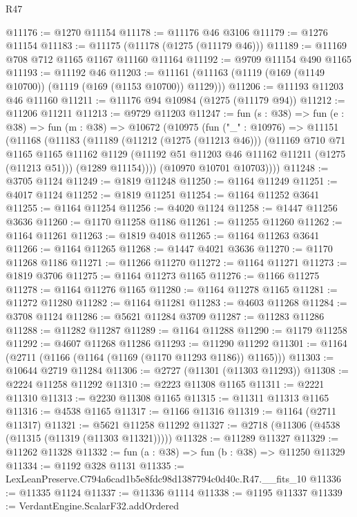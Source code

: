 \begin{lexlean}{R47}
\begin{coremodule}
@11176 := @1270 @11154
@11178 := @11176 @46 @3106
@11179 := @1276 @11154
@11183 := @11175 (@11178 (@1275 (@11179 @46)))
@11189 := @11169 @708 @712 @1165 @1167 @11160 @11164
@11192 := @9709 @11154 @490 @1165
@11193 := @11192 @46
@11203 := @11161 (@11163 (@1119 (@169 (@1149 @10700)) (@1119 (@169 (@1153 @10700)) @1129)))
@11206 := @11193 @11203 @46 @11160
@11211 := @11176 @94 @10984 (@1275 (@11179 @94))
@11212 := @11206 @11211
@11213 := @9729 @11203
@11247 := fun (s : @38) =>
  fun (e : @38) =>
  fun (m : @38) =>
  @10672
    (@10975
      (fun ("_" : @10976) =>
      @11151
        (@11168
          (@11183
            (@11189
              (@11212 (@1275 (@11213 @46)))
              (@11169
                @710
                @71
                @1165
                @1165
                @11162
                @1129
                (@11192 @51 @11203 @46 @11162 @11211 (@1275 (@11213 @51)))
                (@1289 @11154))))
          (@10970 @10701 @10703))))
@11248 := @3705 @1124
@11249 := @1819 @11248
@11250 := @1164 @11249
@11251 := @4017 @1124
@11252 := @1819 @11251
@11254 := @1164 @11252 @3641
@11255 := @1164 @11254
@11256 := @4020 @1124
@11258 := @1447 @11256 @3636
@11260 := @1170 @11258 @1186
@11261 := @11255 @11260
@11262 := @1164 @11261
@11263 := @1819 @4018
@11265 := @1164 @11263 @3641
@11266 := @1164 @11265
@11268 := @1447 @4021 @3636
@11270 := @1170 @11268 @1186
@11271 := @11266 @11270
@11272 := @1164 @11271
@11273 := @1819 @3706
@11275 := @1164 @11273 @1165
@11276 := @1166 @11275
@11278 := @1164 @11276 @1165
@11280 := @1164 @11278 @1165
@11281 := @11272 @11280
@11282 := @1164 @11281
@11283 := @4603 @11268
@11284 := @3708 @1124
@11286 := @5621 @11284 @3709
@11287 := @11283 @11286
@11288 := @11282 @11287
@11289 := @1164 @11288
@11290 := @1179 @11258
@11292 := @4607 @11268 @11286
@11293 := @11290 @11292
@11301 := @1164 (@2711 (@1166 (@1164 (@1169 (@1170 @11293 @1186)) @1165)))
@11303 := @10644 @2719 @11284
@11306 := @2727 (@11301 (@11303 @11293))
@11308 := @2224 @11258 @11292
@11310 := @2223 @11308 @1165
@11311 := @2221 @11310
@11313 := @2230 @11308 @1165
@11315 := @11311 @11313 @1165
@11316 := @4538 @1165
@11317 := @1166 @11316
@11319 := @1164 (@2711 @11317)
@11321 := @5621 @11258 @11292
@11327 := @2718 (@11306 (@4538 (@11315 (@11319 (@11303 @11321)))))
@11328 := @11289 @11327
@11329 := @11262 @11328
@11332 := fun (a : @38) => fun (b : @38) => @11250 @11329
@11334 := @1192 @328 @1131
@11335 := LexLeanPreserve.C794a6cad1b5e8fdc98d1387794c0d40c.R47.__fits_10
@11336 := @11335 @1124
@11337 := @11336 @1114
@11338 := @1195 @11337
@11339 := VerdantEngine.ScalarF32.addOrdered

\end{coremodule}
\end{lexlean}
